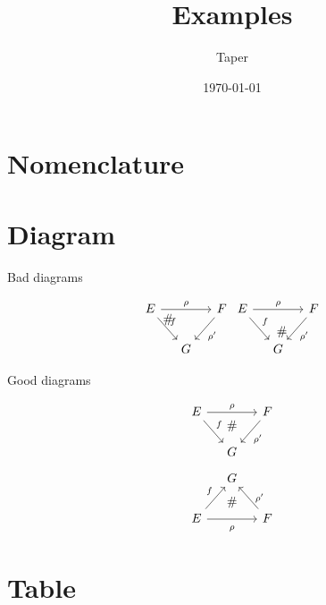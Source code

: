 \documentclass{article}
\title{Examples}
\date{\today}
\author{Taper}
\begin{document}
\maketitle
{}
\tableofcontents
\section{Nomenclature}


\section{Diagram}

\begin{center}
    Bad diagrams
\end{center}
$$
    \begin{tikzcd}[column sep=small]
        E \ar[dr,"f"]\ar[rr,"\rho"]\ar[drr, phantom, "\#", very near
        start] & & F\ar[dl,"\rho'"] \\
        & G &  \,
    \end{tikzcd}
    \begin{tikzcd}[column sep=small]
        E \ar[dr,"f"]\ar[rr,"\rho"]\ar[drr, phantom, "\#"] & & F\ar[dl,"\rho'"] \\
        & G &  \,
    \end{tikzcd}
$$
\begin{center}
    Good diagrams
\end{center}
$$
    \begin{tikzcd}[column sep=small]
        E \ar[dr,"f"]\ar[rr,"\rho"] &
        \ar[d,phantom, "\#", near start] & F\ar[dl,"\rho'"] \\
        & G &  \,
    \end{tikzcd}
$$
$$ \begin{tikzcd}[column sep=small]
& G &  \, \\
E \ar[ur,"f"]\ar[rr,"\rho" below=3] &
\ar[u,phantom, "\#"] 
& F\ar[ul,"\rho'" right=3]
\end{tikzcd} $$

\section{Table}
\end{document}
